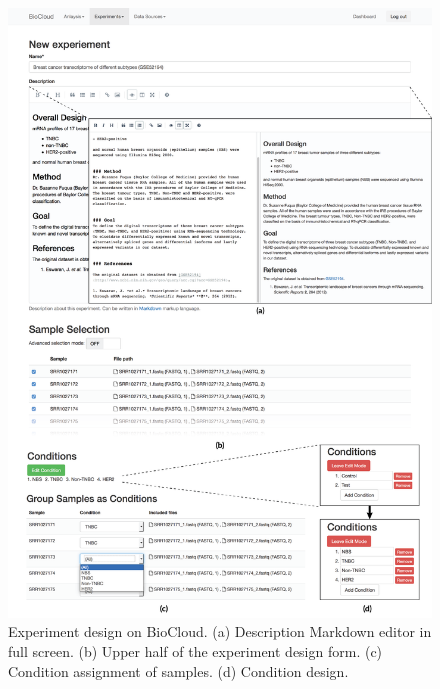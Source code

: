 \begin{figure}[!tbp]
\centering
\includegraphics[width=1\textwidth]{images/biocloud_experiment_design}
\caption[Experiment design on BioCloud]{
    Experiment design on BioCloud.
    (a) Description Markdown editor in full screen.
    (b) Upper half of the experiment design form.
    (c) Condition assignment of samples.
    (d) Condition design.
}
\label{fig:biocloud-experiment-design}
\end{figure}

